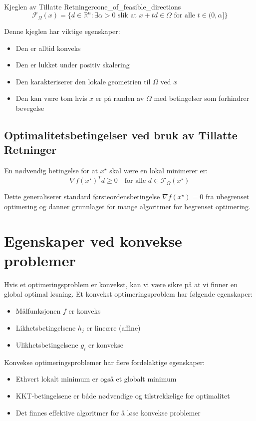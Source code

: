 \begin{definition}{Kjeglen av Tillatte Retninger}{cone_of_feasible_directions}
	\[
		\mathcal{F}_\Omega(x) = \{d \in \mathbb{R}^n : \exists \alpha > 0 \text{ slik at } x + td \in \Omega \text{ for alle } t \in (0, \alpha] \}
	\]
\end{definition}

Denne kjeglen har viktige egenskaper:
\begin{itemize}
	\item Den er alltid konveks
	\item Den er lukket under positiv skalering
	\item Den karakteriserer den lokale geometrien til \(\Omega\) ved \(x\)
	\item Den kan være tom hvis \(x\) er på randen av \(\Omega\) med betingelser som forhindrer bevegelse
\end{itemize}

\subsection{Optimalitetsbetingelser ved bruk av Tillatte Retninger}
En nødvendig betingelse for at \(x^\star\) skal være en lokal minimerer er:
\begin{equation}
	\nabla f(x^\star)^T d \geq 0 \quad \text{for alle } d \in \mathcal{F}_\Omega(x^\star)
\end{equation}

Dette generaliserer standard førsteordensbetingelse \(\nabla f(x^\star) = 0\) fra ubegrenset optimering og danner grunnlaget for mange algoritmer for begrenset optimering.

\section{Egenskaper ved konvekse problemer}

Hvis et optimeringsproblem er konvekst, kan vi være sikre på at vi finner en global optimal løsning. Et konvekst optimeringsproblem har følgende egenskaper:
\begin{itemize}
	\item Målfunksjonen \( f \) er konveks
	\item Likhetsbetingelsene \( h_j \) er lineære (affine)
	\item Ulikhetsbetingelsene \( g_i \) er konvekse
\end{itemize}

Konvekse optimeringsproblemer har flere fordelaktige egenskaper:
\begin{itemize}
	\item Ethvert lokalt minimum er også et globalt minimum
	\item KKT-betingelsene er både nødvendige og tilstrekkelige for optimalitet
	\item Det finnes effektive algoritmer for å løse konvekse problemer
\end{itemize}

